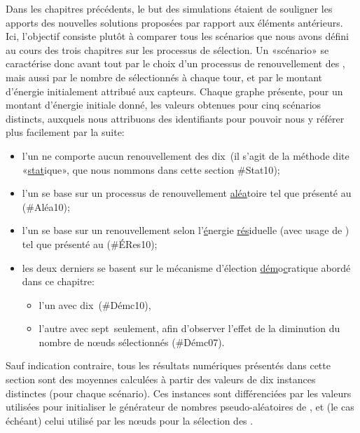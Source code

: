 \newcommand\idstat{\textsf{\#Stat10}\xspace}
\newcommand\idrand{\textsf{\#Aléa10}\xspace}
\newcommand\ideres{\textsf{\#ÉRes10}\xspace}
\newcommand\iddemx{\textsf{\#Démc10}\xspace}
\newcommand\iddems{\textsf{\#Démc07}\xspace}
Dans les chapitres précédents, le but des simulations étaient de souligner les apports des nouvelles solutions proposées par rapport aux éléments antérieurs.
Ici, l'objectif consiste plutôt à comparer tous les scénarios que nous avons défini au cours des trois chapitres sur les processus de sélection.
Un «scénario» se caractérise donc avant tout par le choix d'un processus de renouvellement des \cns, mais aussi par le nombre de \cns sélectionnés à chaque tour, et par le montant d'énergie initialement attribué aux capteurs.
Chaque graphe présente, pour un montant d'énergie initiale donné, les valeurs obtenues pour cinq scénarios distincts, auxquels nous attribuons des identifiants pour pouvoir nous y référer plus facilement par la suite:
\begin{itemize}
    \item l'un ne comporte aucun renouvellement des dix~\cns (il s'agit de la méthode dite «\underline{stat}ique», que nous nommons dans cette section \idstat);
    \item l'un se base sur un processus de renouvellement \underline{aléa}toire tel que présenté au  (\idrand);
    \item l'un se base sur un renouvellement selon l'\underline{é}nergie \underline{rés}iduelle (avec usage de \vns) tel que présenté au  (\ideres);
    \item les deux derniers se basent sur le mécanisme d'élection \underline{dém}o\underline{c}ratique abordé dans ce chapitre:
        \begin{itemize}
            \item l'un avec dix~\cns (\iddemx),
            \item l'autre avec sept~\cns seulement, afin d'observer l'effet de la diminution du nombre de nœuds sélectionnés (\iddems).
        \end{itemize}
\end{itemize}
Sauf indication contraire, tous les résultats numériques présentés dans cette section sont des moyennes calculées à partir des valeurs de dix instances distinctes (pour chaque scénario).
Ces instances sont différenciées par les valeurs utilisées pour initialiser le générateur de nombres pseudo-aléatoires de \nsii, et (le cas échéant) celui utilisé par les nœuds pour la sélection des \cns.

